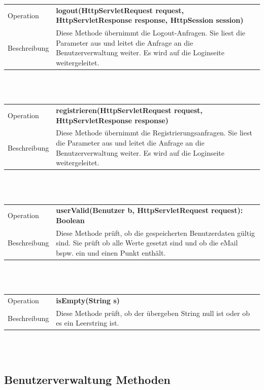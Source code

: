 \documentclass[12pt]{scrreprt}
\begin{document}
\begin{tabular}{|lp{12cm}|}
	\hline
	Operation &  \textbf{logout(HttpServletRequest request, HttpServletResponse response, HttpSession session)}\\ 
	Beschreibung & Diese Methode übernimmt die Logout-Anfragen. Sie liest die Parameter aus und leitet die Anfrage an die Benutzerverwaltung weiter. Es wird auf die Loginseite weitergeleitet. \\ 
	\hline 
\end{tabular} \\\\

\begin{tabular}{|lp{12cm}|}
	\hline
	Operation &  \textbf{registrieren(HttpServletRequest request, HttpServletResponse response)}\\ 
	Beschreibung & Diese Methode übernimmt die Registrierungsanfragen. Sie liest die Parameter aus und leitet die Anfrage an die Benutzerverwaltung weiter. Es wird auf die Loginseite weitergeleitet. \\ 
	\hline 
\end{tabular} \\\\

\begin{tabular}{|lp{12cm}|}
	\hline
	Operation &  \textbf{userValid(Benutzer b, HttpServletRequest request): Boolean}\\ 
	Beschreibung & Diese Methode prüft, ob die gespeicherten Benutzerdaten gültig sind. Sie prüft ob alle Werte gesetzt sind und ob die eMail bspw. ein \@ und einen Punkt enthält. \\ 
	\hline 
\end{tabular} \\\\

\begin{tabular}{|lp{12cm}|}
	\hline
	Operation &  \textbf{isEmpty(String s)}\\ 
	Beschreibung & Diese Methode prüft, ob der übergeben String null ist oder ob es ein Leerstring ist. \\ 
	\hline 
\end{tabular} \\\\

\subsection{Benutzerverwaltung  Methoden}
\end{document}
